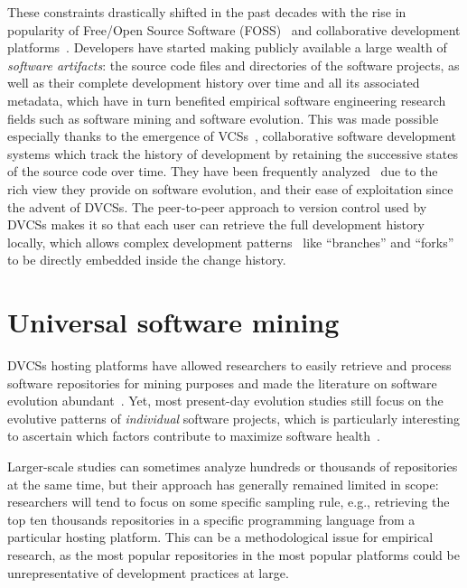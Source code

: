 These constraints drastically shifted in the past decades with the rise in
popularity of Free/Open Source Software
(FOSS)~\cite{syeed-2013-oss-evol-review} and collaborative development
platforms~\cite{kalliamvakou2014promises}. Developers have started making
publicly available a large wealth of \emph{software artifacts}: the source code
files and directories of the software projects, as well as their complete
development history over time and all its associated metadata, which have in
turn benefited empirical software engineering research fields such as software
mining and software evolution. This was made possible especially thanks to the
emergence of \glspl{VCS}~\cite{spinellis2005vcs}, collaborative software
development systems which track the history of development by retaining the
successive states of the source code over time. They have been frequently
analyzed~\cite{kagdi2007msrsurvey} due to the rich view they provide on
software evolution, and their ease of exploitation since the advent of
\glspl{DVCS}. The peer-to-peer approach to version control used by \glspl{DVCS}
makes it so that each user can retrieve the full development history locally,
which allows complex development
patterns~\cite{gousios2014pullrequests,gousios2015work} like ``branches'' and
``forks'' to be directly embedded inside the change history.

\section{Universal software mining}

\glspl{DVCS} hosting platforms have allowed researchers to easily retrieve and
process software repositories for mining purposes and made the literature on
software evolution abundant~\cite{herraiz2013evolution}. Yet, most present-day
evolution studies still focus on the evolutive patterns of \emph{individual}
software projects, which is particularly interesting to ascertain which factors
contribute to maximize software health~\cite{DBLP:conf/icse/2018soheal}.

Larger-scale studies can sometimes analyze hundreds or thousands of
repositories at the same time, but their approach has generally remained
limited in scope: researchers will tend to focus on some specific sampling
rule, e.g., retrieving the top ten thousands repositories in a specific
programming language from a particular hosting platform. This can be a
methodological issue for empirical research, as the most popular repositories
in the most popular platforms could be unrepresentative of development
practices at large.

